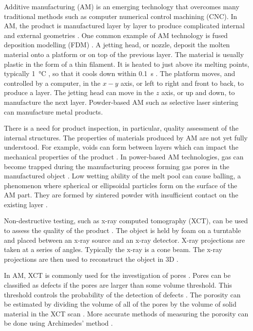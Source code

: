 \documentclass{article}
\begin{document}
Additive manufacturing (AM) is an emerging technology that overcomes many traditional methods such as computer numerical control machining (CNC). In AM, the product is manufactured layer by layer to produce complicated internal and external geometries \citep{ngo2018additive, wong2012review}. One common example of AM technology is fused deposition modelling (FDM) \citep{crump1991fused, crump1992apparatus, stratasys2019what}. A jetting head, or nozzle, deposit the molten material onto a platform or on top of the previous layer. The material is usually plastic in the form of a thin filament. It is heated to just above its melting points, typically \SI{1}{\degreeCelsius} \citep{crump1992apparatus}, so that it cools down within \SI{0.1}{\second} \citep{kruth1991material}. The platform moves, and controlled by a computer, in the $x-y$ axis, or left to right and front to back, to produce a layer. The jetting head can move in the $z$ axis, or up and down, to manufacture the next layer. Powder-based AM such as selective laser sintering \citep{3d2019our, deckard1989method, dtm1990the} can manufacture metal products.

There is a need for product inspection, in particular, quality assessment of the internal structures. The properties of materials produced by AM are not yet fully understood. For example, voids can form between layers which can impact the mechanical properties of the product \citep{ngo2018additive, wang20173d}. In power-based AM technologies, gas can become trapped during the manufacturing process forming gas pores in the manufactured object \citep{tammas2015xct, thijs2010study}. Low wetting ability of the melt pool can cause balling, a phenomenon where spherical or ellipsoidal particles form on the surface of the AM part. They are formed by sintered powder with insufficient contact on the existing layer \citep{gu2009balling, li2012balling}.

Non-destructive testing, such as x-ray computed tomography (XCT), can be used to assess the quality of the product \citep{kruth2011computed, sun2012overview}. The object is held by foam on a turntable and placed between an x-ray source and an x-ray detector. X-ray projections are taken at a series of angles. Typically the x-ray is a cone beam. The x-ray projections are then used to reconstruct the object in 3D \citep{brooks1976principles, feldkamp1984practical, smith1990cone}. 

In AM, XCT is commonly used for the investigation of pores \citep{thompson2016x}. Pores can be classified as defects if the pores are larger than some volume threshold. This threshold controls the probability of the detection of defects \citep{amrhein2014characterization, gandossi2010probability}. The porosity can be estimated by dividing the volume of all of the pores by the volume of solid material in the XCT scan \citep{taud2005porosity}. More accurate methods of measuring the porosity can be done using Archimedes' method \citep{spierings2011comparison}.
\end{document}
